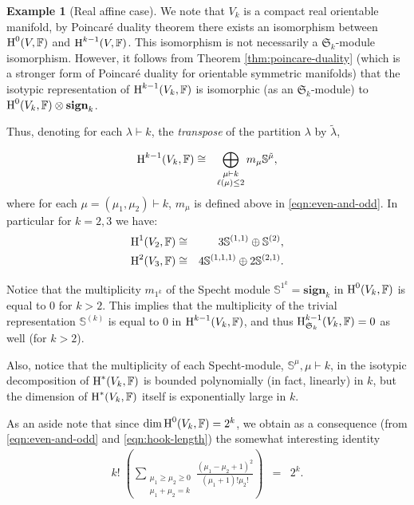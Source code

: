\documentclass{amsart}
\theoremstyle{definition}
\newtheorem{example}{Example}
\theoremstyle{remark}
\numberwithin{equation}{section}
\begin{document}
\begin{example}[Real affine case]
We note that $V_k$ is a compact real orientable manifold, 
by Poincar\'e duality theorem there exists an isomorphism between ${\mbox{\rm H}}^0(V,{\mathbb{F}})$ and ${\mbox{\rm H}}^{k-1}(V,{\mathbb{F}})$. This
isomorphism is not necessarily a $\mathfrak{S}_k$-module isomorphism. However, it follows from  
Theorem \ref{thm:poincare-duality} (which is a stronger form of Poincar\'e duality for orientable symmetric manifolds) 
that the isotypic representation
of ${\mbox{\rm H}}^{k-1}(V_k,{\mathbb{F}})$ is isomorphic (as an $\mathfrak{S}_k$-module) to 
${\mbox{\rm H}}^0(V_k,{\mathbb{F}}) \otimes
\textbf{sign}_{k}
$.

Thus, denoting for each $\lambda \vdash k$, the \emph{transpose} of the partition $\lambda$ by $\tilde{\lambda}$, 

\begin{eqnarray*}
{\mbox{\rm H}}^{k-1}(V_k,{\mathbb{F}}) &\cong &  \bigoplus_{\substack{\mu \vdash k\\ \ell(\mu) \leq 2}} m_\mu \mathbb{S}^{\tilde{\mu}},
\end{eqnarray*}
where  for  each $\mu = (\mu_1,\mu_2)  \vdash k$,  
$m_\mu$ is defined above in \eqref{eqn:even-and-odd}.
In particular for $k=2,3$ we have:
\begin{eqnarray*}
{\mbox{\rm H}}^1(V_2,{\mathbb{F}}) &\cong &  3\mathbb{S}^{(1,1)} \oplus \mathbb{S}^{(2)}, \\
{\mbox{\rm H}}^2(V_3,{\mathbb{F}}) &\cong &  4\mathbb{S}^{(1,1,1)} \oplus 2\mathbb{S}^{(2,1)}.
\end{eqnarray*}

Notice that the multiplicity $m_{1^k}$ of the Specht module 
$\mathbb{S}^{1^k} = \textbf{sign}_{k}$ in
${\mbox{\rm H}}^0(V_k,{\mathbb{F}})$ is equal to $0$ for $k>2$. This implies that the multiplicity of the trivial
representation $\mathbb{S}^{(k)}$ is equal to $0$ in ${\mbox{\rm H}}^{k-1}(V_k,{\mathbb{F}})$, and thus
${\mbox{\rm H}}^{k-1}_{\mathfrak{S}_k}(V_k,{\mathbb{F}})=0$ as well (for $k >2$).

 Also, notice that  the multiplicity of each Specht-module, $\mathbb{S}^\mu, \mu \vdash k$, 
in the isotypic decomposition of ${\mbox{\rm H}}^*(V_k,{\mathbb{F}})$ is bounded
polynomially (in fact, linearly) in $k$, but the dimension of ${\mbox{\rm H}}^*(V_k,{\mathbb{F}})$ itself  is exponentially large in $k$.  

As an aside note that  since $\dim {\mbox{\rm H}}^0(V_k,{\mathbb{F}}) =  2^k$, we obtain as a consequence  (from \eqref{eqn:even-and-odd} and 
 \eqref{eqn:hook-length}) the somewhat interesting identity
 \begin{eqnarray*}
  k!\;\left(\sum_{\substack{
  \mu_1 \geq \mu_2\geq 0\\ \mu_1+\mu_2 =k} }  \frac{(\mu_1 - \mu_2 +1)^2}{(\mu_1+1)!\mu_2!}\right)
   &=& 2^k.
  \end{eqnarray*}
\end{example}
\end{document}
